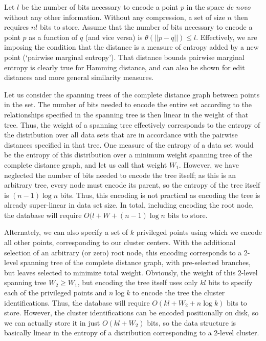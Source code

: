 \documentclass[review,preprint,12pt]{elsarticle}
\theoremstyle{definition}
\theoremstyle{remark}
\begin{document}
Let $l$ be the number of bits necessary to encode a point $p$ in the space \textit{de novo} without any other information.
Without any compression, a set of size $n$ then requires $nl$ bits to store.
Assume that the number of bits necessary to encode a point $p$ as a function of $q$ (and vice versa) is $\theta(||p-q||) \le l$.
Effectively, we are imposing the condition that the distance is a measure of entropy added by a new point (`pairwise marginal entropy').
That distance bounds pairwise marginal entropy is clearly true for Hamming distance, and can also be shown for edit distances and more general similarity measures.

Let us consider the spanning trees of the complete distance graph between points in the set.
The number of bits needed to encode the entire set according to the relationships specified in the spanning tree is then linear in the weight of that tree.
Thus, the weight of a spanning tree effectively corresponds to the entropy of the distribution over all data sets that are in accordance with the pairwise distances specified in that tree.
One measure of the entropy of a data set would be the entropy of this distribution over a minimum weight spanning tree of the complete distance graph, and let us call that weight $W_1$.
However, we have neglected the number of bits needed to encode the tree itself; as this is an arbitrary tree, every node must encode its parent, so the entropy of the tree itself is $ (n-1) \log n$ bits.
Thus, this encoding is not practical as encoding the tree is already super-linear in data set size.
In total, including encoding the root node, the database will require $O(l + W + (n-1)\log n$ bits to store.

Alternately, we can also specify a set of $k$ privileged points using which we encode all other points, corresponding to our cluster centers.
With the additional selection of an arbitrary (or zero) root node, this encoding corresponds to a 2-level spanning tree of the complete distance graph, with pre-selected branches, but leaves selected to minimize total weight.
Obviously, the weight of this 2-level spanning tree $W_2 \ge W_1$, but
encoding the tree itself uses only $kl$ bits to specify each of the privileged points and $n \log k$ to encode the tree the cluster identifications.
Thus, the database will require $O(kl + W_2 + n \log k)$ bits to store.
However, the cluster identifications can be encoded positionally on disk, so we can actually store it in just $O(kl + W_2)$ bits, so the data structure is basically linear in the entropy of a distribution corresponding to a 2-level cluster.
\end{document}
